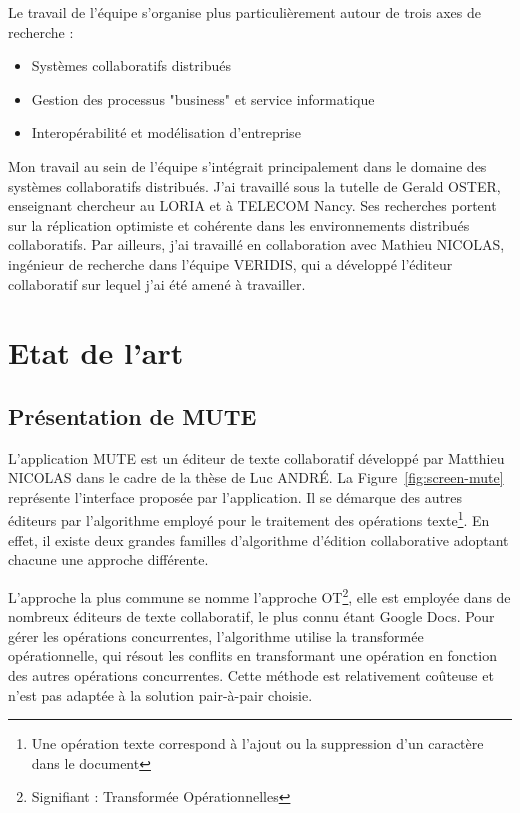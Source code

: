 \documentclass{tnreport}
\begin{document}
Le travail de l'équipe s'organise plus particulièrement autour de trois axes de recherche :

\begin{itemize}
  \item Systèmes collaboratifs distribués
  \item Gestion des processus "business" et service informatique
  \item Interopérabilité et modélisation d'entreprise
\end{itemize}

Mon travail au sein de l'équipe s'intégrait principalement dans le domaine des systèmes collaboratifs distribués. J'ai travaillé sous la tutelle de Gerald OSTER, enseignant chercheur au LORIA et à TELECOM Nancy. Ses recherches portent sur la réplication optimiste et cohérente dans les environnements distribués collaboratifs. Par ailleurs, j'ai travaillé en collaboration avec Mathieu NICOLAS, ingénieur de recherche dans l'équipe VERIDIS, qui a développé l'éditeur collaboratif sur lequel j'ai été amené à travailler.  

\cleardoublepage


\chapter{Etat de l'art}

\section{Présentation de MUTE}

L'application MUTE est un éditeur de texte collaboratif développé par Matthieu NICOLAS dans le cadre de la thèse de Luc ANDRÉ. La Figure~\ref{fig:screen-mute} représente l'interface proposée par l'application. Il se démarque des autres éditeurs par l'algorithme employé pour le traitement des opérations texte\footnote{Une opération texte correspond à l'ajout ou la suppression d'un caractère dans le document}. En effet, il existe deux grandes familles d'algorithme d'édition collaborative adoptant chacune une approche différente. 

L'approche la plus commune se nomme l'approche OT\footnote{Signifiant : Transformée Opérationnelles}, elle est employée dans de nombreux éditeurs de texte collaboratif, le plus connu étant Google Docs. Pour gérer les opérations concurrentes, l'algorithme utilise la transformée opérationnelle, qui résout les conflits en transformant une opération en fonction des autres opérations concurrentes. Cette méthode est relativement coûteuse et n'est pas adaptée à la solution pair-à-pair choisie. 
\end{document}
